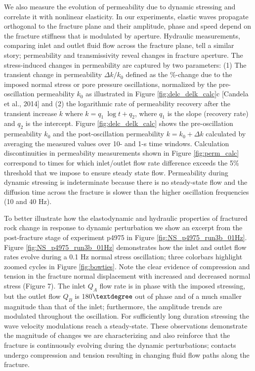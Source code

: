 \documentclass[draft]{agujournal2019}
\begin{document}
We also measure the evolution of permeability due to dynamic stressing and correlate it with nonlinear elasticity. In our experiments, elastic waves propagate orthogonal to the fracture plane and their amplitude, phase and speed depend on the fracture stiffness that is modulated by aperture. Hydraulic measurements, comparing inlet and outlet fluid flow across the fracture plane, tell a similar story; permeability and transmissivity reveal changes in fracture aperture.
The stress-induced changes in permeability are captured by two parameters: (1) The transient change in permeability $ \Delta k/k_0 $ defined as the \%-change due to the imposed normal stress or pore pressure oscillations, normalized by the pre-oscillation permeability $ k_0 $ as illustrated in Figure \ref{fig:delc_delk_calc}c [Candela et al., 2014] and (2) the logarithmic rate of permeability recovery after the transient increase $ \dot k $ where $ k = q_1\ \log{t} + q_2 $, where $q_1$ is the slope (recovery rate) and $q_2$ is the intercept.
Figure \ref{fig:delc_delk_calc} shows the pre-oscillation permeability $ k_0 $ and the post-oscillation permeability $ k = k_0 + \Delta k $ calculated by averaging the measured values over 10- and 1-s time windows. Calculation discontinuities in permeability measurements shown in Figure \ref{fig:perm_calc} correspond to times for which inlet/outlet flow rate difference exceeds the 5\% threshold that we impose to ensure steady state flow. Permeability during dynamic stressing is indeterminate because there is no steady-state flow and the diffusion time across the fracture is slower than the higher oscillation frequencies (10 and  40 Hz). 


To better illustrate how the elastodynamic and hydraulic properties of fractured rock change in response to dynamic perturbation we show an excerpt from the post-fracture stage of experiment p4975 in Figure \ref{fig:NS_p4975_run3b_01Hz}.
Figure  \ref{fig:NS_p4975_run3b_01Hz} demonstrates how the inlet and outlet flow rates evolve during a 0.1 Hz normal stress oscillation; three colorbars highlight zoomed cycles in Figure \ref{fig:bowties}. Note the clear evidence of compression and tension in the fracture normal displacement with increased and decreased normal stress (Figure 7). The inlet $ Q_A $ flow rate is in phase with the imposed stressing, but the outlet flow $ Q_B $ is 180$\textdegree$ out of phase and of a much smaller magnitude than that of the inlet;  furthermore, the amplitude trends are modulated throughout the oscillation. For sufficiently long duration stressing the wave velocity modulations reach a steady-state. These observations demonstrate the magnitude of changes we are characterizing and also reinforce that the fracture is continuously evolving during the dynamic perturbations; contacts undergo compression and tension resulting in changing fluid flow paths along the fracture.
\end{document}
